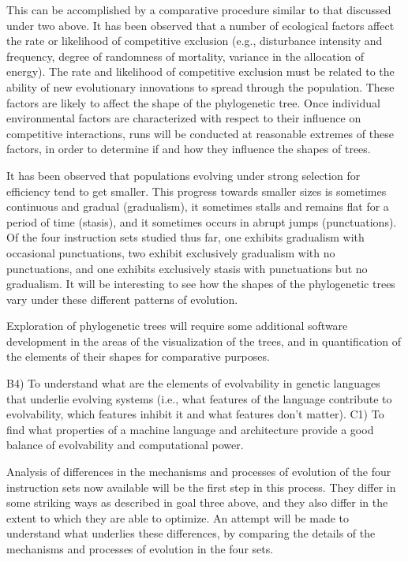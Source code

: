 This can be accomplished by a comparative procedure similar to that discussed
under two above.  It has been observed that a number of ecological factors
affect the rate or likelihood of competitive exclusion (e.g., disturbance
intensity and frequency, degree of randomness of mortality, variance in the
allocation of energy).  The rate and likelihood of competitive exclusion
must be related to the ability of new evolutionary innovations to spread
through the population.  These factors are likely to affect the shape of
the phylogenetic tree.  Once individual environmental factors are characterized
with respect to their influence on competitive interactions, runs will be
conducted at reasonable extremes of these factors, in order to determine
if and how they influence the shapes of trees.

It has been observed that populations evolving under strong selection
for efficiency tend to get smaller.  This progress towards smaller sizes
is sometimes continuous and gradual (gradualism), it sometimes stalls and
remains flat for a period of time (stasis), and it sometimes occurs in abrupt
jumps (punctuations).  Of the four instruction sets studied thus far, one
exhibits gradualism with occasional punctuations, two exhibit exclusively
gradualism with no punctuations, and one exhibits exclusively stasis with
punctuations but no gradualism.  It will be interesting to see how the shapes
of the phylogenetic trees vary under these different patterns of evolution.

Exploration of phylogenetic trees will require some additional software
development in the areas of the visualization of the trees, and in
quantification of the elements of their shapes for comparative purposes.

\XP
B4) To understand what are the elements of evolvability in genetic languages
that underlie evolving systems (i.e., what features of the language contribute
to evolvability, which features inhibit it and what features don't matter).
C1) To find what properties of a machine language and architecture provide
a good balance of evolvability and computational power.
\eXP

Analysis of differences in the mechanisms and processes of evolution of the
four instruction sets now available will be the first step in this process.
They differ in some striking ways as described in goal three above, and
they also differ in the extent to which they are able to optimize.  An
attempt will be made to understand what underlies these differences, by
comparing the details of the mechanisms and processes of evolution in the
four sets.

